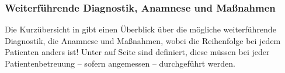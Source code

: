 \documentclass[
ngerman,
paper=a4,
asymmetric,
fontsize=10pt,
headings=small,
draft=false,
numbers=noenddot,
bibtotocnumbered,
footnotes=multiple,
]{scrreprt}
\begin{document}
% 
% 
% 


% 
% 


\subsubsection{Weiterführende Diagnostik, Anamnese und
Maßnahmen}


Die Kurzübersicht in 
 gibt einen
Überblick über die mögliche weiterführende Diagnostik, die
Anamnese und Maßnahmen, wobei die
Reihenfolge bei jedem Patienten anders ist!
Unter  auf Seite
\pageref{m:standardmassnahmen-immer} sind  definiert, diese 
müssen bei jeder Patientenbetreuung -- sofern angemessen --
durchgeführt werden.
\end{document}
